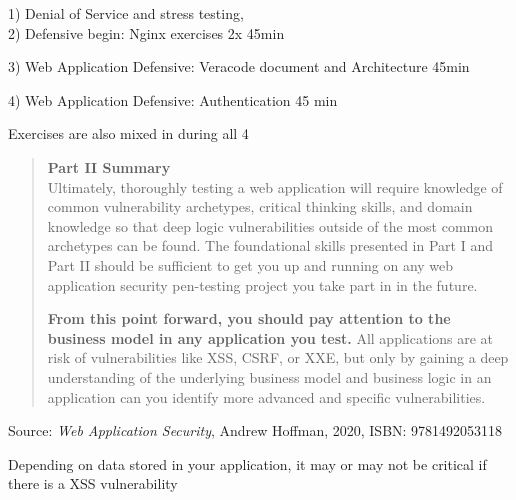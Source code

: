 \documentclass[Screen16to9,17pt]{foils}
\begin{document}

\begin{list2}
\item 1) Denial of Service and stress testing,\\
2) Defensive begin: Nginx exercises 2x 45min
\item 3) Web Application Defensive: Veracode document and Architecture 45min
\item 4) Web Application Defensive: Authentication 45 min
\end{list2}

Exercises are also mixed in during all 4




\begin{quote}
{\bf Part II Summary}\\

Ultimately, thoroughly testing a web application will require knowledge of common vulnerability archetypes, critical thinking skills, and domain knowledge so that deep logic vulnerabilities outside of the most common archetypes can be found. The foundational skills presented in Part I and Part II should be sufficient to get you up and running on any web application security pen-testing project you take part in in the future.

{\bf From this point forward, you should pay attention to the business model in any application you test.} All applications are at risk of vulnerabilities like XSS, CSRF, or XXE, but only by gaining a deep understanding of the underlying business model and business logic in an application can you identify more advanced and specific
vulnerabilities.
\end{quote}
Source: \emph{Web Application Security}, Andrew Hoffman, 2020, ISBN: 9781492053118


\begin{list2}
\item Depending on data stored in your application, it may or may not be critical if there is a XSS vulnerability
\end{list2}


\end{document}

